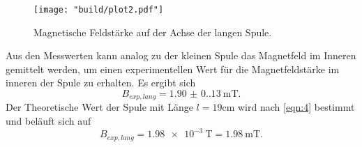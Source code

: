 \begin{figure}[H]
    \caption{Magnetische Feldstärke auf der Achse der langen Spule.}
    \label{fig:1}
    \centering
    \texttt{[image: "build/plot2.pdf"]}
\end{figure}
\noindent Aus den Messwerten kann analog zu der kleinen Spule das Magnetfeld
im Inneren gemittelt werden, um einen experimentellen Wert für die 
Magnetfeldstärke im inneren der Spule zu erhalten. Es ergibt sich
\begin{equation*}
    B_{exp,lang} = \qty{1.90(0.13)}{\milli\tesla}.
\end{equation*}
Der Theoretische Wert der Spule mit Länge $l = 19\unit{\centi\meter}$ wird
nach \autoref{eqn:4} bestimmt und beläuft sich auf
\begin{equation*}
    B_{exp,lang} = \qty{1.98e-3}{\tesla} = \qty{1.98}{\milli\tesla}.
\end{equation*}

